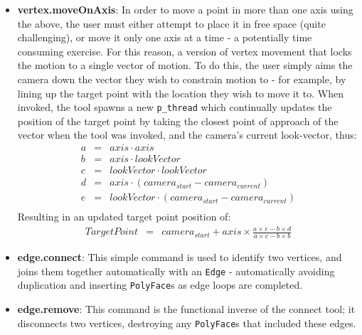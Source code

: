 \documentclass[a4paper,10pt]{report}
\begin{document}
\begin{itemize}
\item{\textbf{vertex.moveOnAxis}: In order to move a point in more than one axis using the above, the user must either attempt to place it in free space (quite challenging), or move it only one axis at a time - a potentially time consuming exercise. For this reason, a version of vertex movement that locks the motion to a single vector of motion. To do this, the user simply aims the camera down the vector they wish to constrain motion to - for example, by lining up the target point with the location they wish to move it to. When invoked, the tool spawns a new \texttt{p\_thread} which continually updates the position of the target point by taking the closest point of approach of the vector when the tool was invoked, and the camera's current look-vector, thus:
\begin{eqnarray*}
  a &=& axis \cdot axis \\
  b &=& axis \cdot lookVector \\
  c &=& lookVector \cdot lookVector \\
  d &=& axis \cdot (camera_{start} - camera_{current}) \\
  e &=& lookVector \cdot (camera_{start} - camera_{current}) \\
\end{eqnarray*}  Resulting in an updated target point position of:
\begin{eqnarray*}
  TargetPoint &=& camera_{start} + axis \times \frac{a \times e - b \times d}{a \times c - b \times b}
\end{eqnarray*}
}

\item{\textbf{edge.connect}: This simple command is used to identify two vertices, and joins them together automatically with an \texttt{Edge} - automatically avoiding duplication and inserting \texttt{PolyFace}s as edge loops are completed.}

\item{\textbf{edge.remove}: This command is the functional inverse of the connect tool; it disconnects two vertices, destroying any \texttt{PolyFace}s that included these edges.}


\end{itemize}
\end{document}
